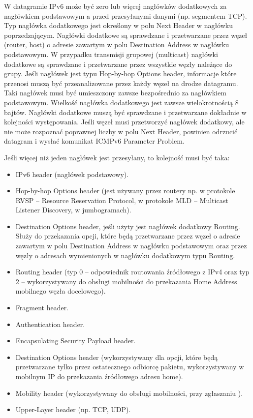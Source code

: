     W datagramie IPv6 może być zero lub więcej nagłówków dodatkowych za nagłówkiem
    podstawowym a przed przesyłanymi danymi (np. segmentem TCP). Typ nagłówka
    dodatkowego jest określony w polu Next Header w nagłówku poprzedzającym. Nagłówki
    dodatkowe są sprawdzane i przetwarzane przez węzeł (router, host) o adresie zawartym w
    polu Destination Address w nagłówku podstawowym. W przypadku transmisji grupowej
    (multicast) nagłówki dodatkowe są sprawdzane i przetwarzane przez wszystkie węzły
    należące do grupy.
    Jeśli nagłówek jest typu Hop-by-hop Options header, informacje które przenosi muszą być
    przeanalizowane przez każdy węzeł na drodze datagramu. Taki nagłówek musi być
    umieszczony zawsze bezpośrednio za nagłówkiem podstawowym.
    Wielkość nagłówka dodatkowego jest zawsze wielokrotnością 8 bajtów.
    Nagłówki dodatkowe muszą być sprawdzane i przetwarzane dokładnie w kolejności
    występowania.
    Jeśli węzeł musi przetworzyć nagłówek dodatkowy, ale nie może rozpoznać poprawnej liczby
    w polu Next Header, powinien odrzucić datagram i wysłać komunikat ICMPv6 Parameter
    Problem.

    Jeśli więcej niż jeden nagłówek jest przesyłany, to kolejność musi być taka:
    \begin{itemize}
        \item IPv6 header (nagłówek podstawowy).
        \item Hop-by-hop Options header (jest używany przez routery np. w protokole RVSP – Resource
        Reservation Protocol, w protokole MLD – Multicast Listener Discovery, w jumbogramach).
        \item Destination Options header, jeśli użyty jest nagłówek dodatkowy Routing. Służy do
        przekazania opcji, które będą przetwarzane przez węzeł o adresie zawartym w polu
        Destination Address w nagłówku podstawowym oraz przez węzły o adresach
        wymienionych w nagłówku dodatkowym typu Routing.
        \item Routing header (typ 0 – odpowiednik routowania źródłowego z IPv4 oraz typ 2 –
        wykorzystywany do obsługi mobilności do przekazania Home Address mobilnego węzła
        docelowego).
        \item Fragment header.
        \item Authentication header.
        \item Encapsulating Security Payload header.
        \item Destination Options header (wykorzystywany dla opcji, które będą przetwarzane tylko
        przez ostatecznego odbiorcę pakietu, wykorzystywany w mobilnym IP do przekazania
        źródłowego adresu home).
        \item Mobility header (wykorzystywany do obsługi mobilności, przy zgłaszaniu ).
        \item Upper-Layer header (np. TCP, UDP).
    \end{itemize}

